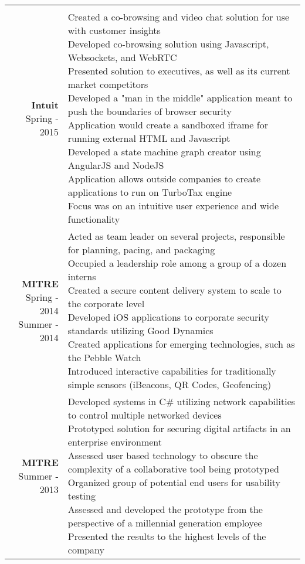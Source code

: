 \documentclass{article}
\makeatletter
\newcommand*\lineBr[2][c]{\begin{tabular}[#1]{@{}r@{}}#2\end{tabular}}
\newcommand*\lineBl[2][c]{\begin{tabular}[#1]{@{}l@{}}#2\end{tabular}}
\makeatother
\begin{document}
\begin{tabularx}{\textwidth}{ r | X }
{  } \\
  \vspace{4mm}
  \lineBr{ {\large {\bf Intuit }\\[2mm]Spring - 2015}} &
  \lineBl{
    Created a co-browsing and video chat solution for use with customer insights \\[2mm]
    Developed co-browsing solution using Javascript, Websockets, and WebRTC \\[2mm]
    Presented solution to executives, as well as its current market competitors \\[2mm]
    Developed a "man in the middle" application meant to push the boundaries of browser security \\[2mm]
    Application would create a sandboxed iframe for running external HTML and Javascript \\[2mm]
    Developed a state machine graph creator using AngularJS and NodeJS \\[2mm]
    Application allows outside companies to create applications to run on TurboTax engine \\[2mm]
    Focus was on an intuitive user experience and wide functionality 
  } \\
  \vspace{4mm}
  \lineBr{ {\large {\bf MITRE }\\[2mm]Spring - 2014\\Summer - 2014}} &
  \lineBl{
    Acted as team leader on several projects, responsible for planning, pacing, and packaging \\[2mm]
    Occupied a leadership role among a group of a dozen interns \\[2mm]
    Created a secure content delivery system to scale to the corporate level \\[2mm]
    Developed iOS applications to corporate security standards utilizing Good Dynamics \\[2mm]
    Created applications for emerging technologies, such as the Pebble Watch \\[2mm]
    Introduced interactive capabilities for traditionally simple sensors (iBeacons, QR Codes, Geofencing) \\[2mm]
  } \\
  \vspace{4mm}
  \lineBr{ {\large {\bf MITRE }\\[2mm]Summer - 2013}} &
  \lineBl{
    Developed systems in C\# utilizing network capabilities to control multiple networked devices \\[2mm]
    Prototyped solution for securing digital artifacts in an enterprise environment\\[2mm]
    Assessed user based technology to obscure the complexity of a collaborative tool being prototyped \\[2mm]
    Organized group of potential end users for usability testing \\[2mm]
    Assessed and developed the prototype from the perspective of a millennial generation employee \\[2mm]
    Presented the results to the highest levels of the company 
  }
\end{tabularx}
\end{document}
